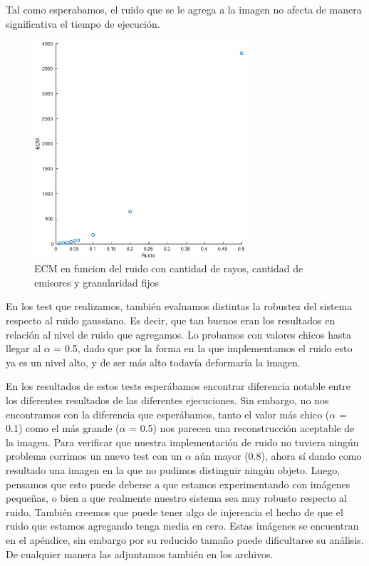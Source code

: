 \par Tal como esperabamos, el ruido que se le agrega a la imagen no afecta de manera significativa el tiempo de ejecuci\'on.

\begin{figure}[H]
	\centering	\includegraphics[width=0.7\textwidth]{img/ruido_ecm}
	\caption{ECM en funcion del ruido con cantidad de rayos, cantidad de emisores y granularidad fijos}
	\label{fig:ruido_ecm}
\end{figure}

\par En los test que realizamos, también evaluamos distintas la robustez del sistema respecto al ruido gaussiano. Es decir, que tan buenos eran los resultados en relación al nivel de ruido que agregamos.
Lo probamos con valores chicos hasta llegar al $\alpha$ = 0.5, dado que por la forma en la que implementamos el ruido esto ya es un nivel alto, y de ser más alto todavía deformaría la imagen.

\par En los resultados de estos tests esperábamos encontrar diferencia notable entre los diferentes resultados de las diferentes ejecuciones. Sin embargo, no nos encontramos con la diferencia que esperábamos, tanto el valor más chico ($\alpha$ = 0.1) como el más grande ($\alpha$ = 0.5) nos parecen una reconstrucción aceptable de la imagen.
Para verificar que nuestra implementación de ruido no tuviera ningún problema corrimos un nuevo test con un $\alpha$ aún mayor (0.8), ahora sí dando como resultado una imagen en la que no pudimos distinguir ningún objeto.
Luego, pensamos que esto puede deberse a que estamos experimentando con imágenes pequeñas, o bien a que realmente nuestro sistema sea muy robusto respecto al ruido. También creemos que puede tener algo de injerencia el hecho de que el ruido que estamos agregando tenga media en cero. 
Estas imágenes se encuentran en el apéndice, sin embargo por su reducido tamaño puede dificultarse su análisis. De cualquier manera las adjuntamos también en los archivos.